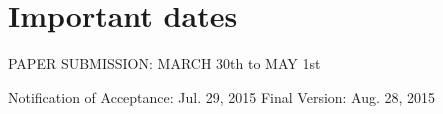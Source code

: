 \documentclass[letterpaper,oneside,onecolumn,draftclsnofoot,12pt,conference]{IEEEtran}
\begin{document}
%






\section{Important dates }

PAPER SUBMISSION: MARCH 30th to MAY 1st

Notification of Acceptance:     Jul. 29, 2015 Final Version:	Aug. 28, 2015





\end{document}
